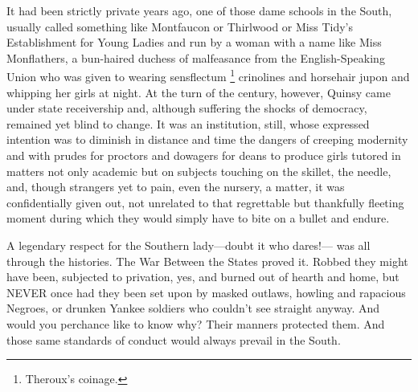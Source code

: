   It had been strictly private years ago, one of those dame 
schools in the
South, usually called something like Montfaucon or Thirlwood or Miss Tidy's
Establishment for Young Ladies and run by a woman with a name like Miss
Monflathers, a bun-haired duchess of malfeasance 
from the English-Speaking Union who was given to wearing sensflectum 
\footnote{ \textdbend Theroux's coinage.}
crinolines 
and horsehair jupon 
and whipping her girls at night. At the turn of the century, however, Quinsy 
came under state receivership and, although suffering the shocks of democracy, 
remained yet blind
to change. It was an institution, still, whose expressed intention was to
diminish in distance and time the dangers of creeping modernity and with prudes
for proctors 
and dowagers for deans to produce girls tutored in matters not only
academic but on subjects touching on the skillet, 
the needle, and, though
strangers yet to pain, even the nursery, a matter, it was confidentially given
out, not unrelated to that regrettable but thankfully fleeting moment during
which they would simply have to bite on a bullet and endure.

  A legendary respect for the Southern lady---doubt it who dares!--- was all 
through the histories. The War Between the States proved it. Robbed they might 
have been, subjected to privation, 
yes, and burned out of hearth 
and home, but NEVER
once had they been set upon by masked outlaws, howling and rapacious 
Negroes, or
drunken Yankee soldiers who couldn't see straight anyway. And would you
perchance like to know why? Their manners protected them. And those same
standards of conduct would always prevail in the South.

